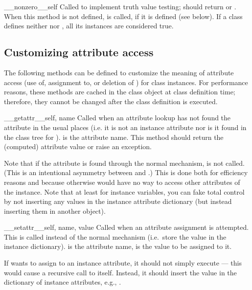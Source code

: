 \begin{methoddescni}{__nonzero__}{self}
Called to implement truth value testing; should return  or
.  When this method is not defined,  is
called, if it is defined (see below).  If a class defines neither
 nor , all its instances are
considered true.
\end{methoddescni}


\subsection{Customizing attribute access\label{attribute-access}}

The following methods can be defined to customize the meaning of
attribute access (use of, assignment to, or deletion of )
for class instances.
For performance reasons, these methods are cached in the class object
at class definition time; therefore, they cannot be changed after the
class definition is executed.

\begin{methoddescni}{__getattr__}{self, name}
Called when an attribute lookup has not found the attribute in the
usual places (i.e. it is not an instance attribute nor is it found in
the class tree for ).   is the attribute name.
This method should return the (computed) attribute value or raise an
 exception.

Note that if the attribute is found through the normal mechanism,
 is not called.  (This is an intentional
asymmetry between  and .)
This is done both for efficiency reasons and because otherwise
 would have no way to access other attributes of
the instance.
Note that at least for instance variables, you can fake
total control by not inserting any values in the instance
attribute dictionary (but instead inserting them in another object).
\end{methoddescni}

\begin{methoddescni}{__setattr__}{self, name, value}
Called when an attribute assignment is attempted.  This is called
instead of the normal mechanism (i.e.\ store the value in the instance
dictionary).   is the attribute name,  is the
value to be assigned to it.

If  wants to assign to an instance attribute, it 
should not simply execute  --- this
would cause a recursive call to itself.  Instead, it should insert the
value in the dictionary of instance attributes, e.g.,
.
\end{methoddescni}

